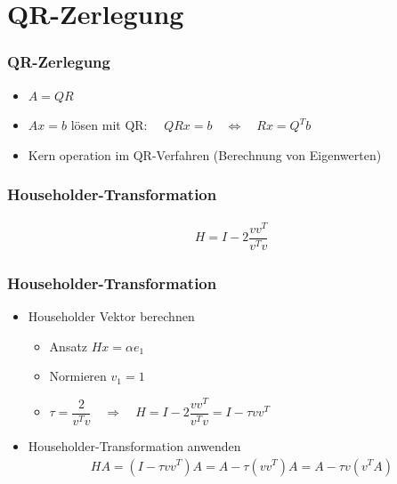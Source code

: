 \section{QR-Zerlegung}
\begin{frame}
	\frametitle{QR-Zerlegung}
	\begin{itemize}
		\item $ A = QR $\\
		\scalebox{.8}{}
		\item $ Ax = b $ lösen mit QR: $\quad QRx=b \quad \Longleftrightarrow \quad Rx=Q^Tb $
		\item Kern operation im QR-Verfahren (Berechnung von Eigenwerten)
	\end{itemize}
\end{frame}

\begin{frame}
	\frametitle{Householder-Transformation}
	\vspace{-1cm}
	\begin{align*}
		H = I - 2 \dfrac{vv^T}{v^Tv}
	\end{align*}
	\centering
	\scalebox{.8}{}

\end{frame}

\begin{frame}
	\frametitle{Householder-Transformation}
	\vspace{-1cm}
	\begin{itemize}
	\item Householder Vektor berechnen\\
		\begin{itemize}
			\item Ansatz $ Hx = \alpha e_1 $
			\item Normieren $ v_1 = 1 $
			\item $ \tau = \dfrac{2}{v^Tv} \quad \Longrightarrow \quad H = I - 2 \dfrac{vv^T}{v^Tv} = I - \tau vv^T$
		\end{itemize}
		

	\item  Householder-Transformation anwenden
		\begin{align*} 
		H A =(I - \tau vv^T) A= A - \tau (vv^T )A = A - \tau v(v^TA)
		\end{align*}
	\end{itemize}
\end{frame}

